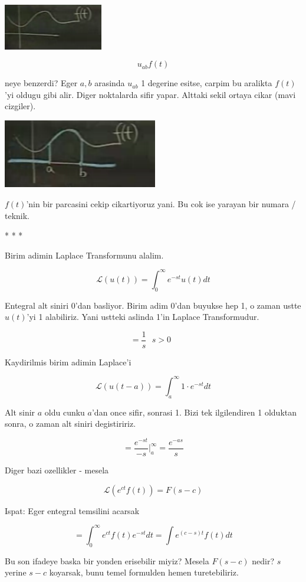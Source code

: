 \documentclass[12pt,fleqn]{article}
\begin{document}
\includegraphics[height=2cm]{22_4.png}

\[ u_{ab}f(t) \]

neye benzerdi? Eger $a,b$ arasinda $u_{ab}$ 1 degerine esitse, carpim bu
aralikta $f(t)$'yi oldugu gibi alir. Diger noktalarda sifir yapar. Alttaki
sekil ortaya cikar (mavi cizgiler). 

\includegraphics[height=3cm]{22_5.png}

$f(t)$'nin bir parcasini cekip cikartiyoruz yani. Bu cok ise yarayan bir
numara / teknik. 

* * *

Birim adimin Laplace Transformunu alalim.

\[ \mathcal{L}(u(t)) = \int_{0}^{\infty} e^{-st}u(t) dt  \]

Entegral alt siniri 0'dan basliyor. Birim adim 0'dan buyukse hep 1, o zaman
ustte $u(t)$'yi 1 alabiliriz. Yani ustteki aslinda 1'in Laplace
Transformudur. 

\[ = \frac{1}{s} \ \ \ s>0 
\ \ \ \label{1}
\]

Kaydirilmis birim adimin Laplace'i

\[ \mathcal{L} (u(t-a)) = 
\int_{a}^{\infty} 1 \cdot e^{-st} dt
 \]

Alt sinir $a$ oldu cunku $a$'dan once sifir, sonrasi 1. Bizi tek
ilgilendiren 1 olduktan sonra, o zaman alt siniri degistiririz. 

\[ = \frac{e^{-st}}{-s} \bigg|_{a}^{\infty} =
\frac{e^{-as}}{s}
\]

Diger bazi ozellikler - mesela 

\[ \mathcal{L}(e^{ct}f(t)) = F(s-c) \]

Ispat: Eger entegral temsilini acarsak

\[ = \int _{0}^{\infty} e^{ct}f(t)e^{-st}dt  =
\int e^{(c-s)t} f(t) dt
 \]


Bu son ifadeye baska bir yonden erisebilir miyiz? Mesela $F(s-c)$ nedir? 
$s$ yerine $s-c$ koyarsak, bunu temel formulden hemen turetebiliriz. 
\end{document}
